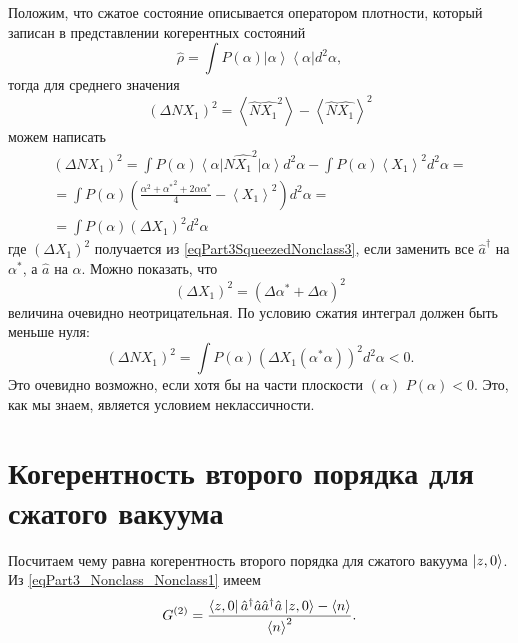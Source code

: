 Положим, что сжатое состояние описывается оператором плотности,
который записан в представлении когерентных состояний
\[
\hat{\rho} = \int P\left(\alpha\right)
\left|\alpha\right>
\left<\alpha\right| d^2 \alpha,
\]
тогда для среднего значения 
\begin{equation}
\left(\Delta N X_1\right)^2 = 
\left<\hat{N} \hat{X_1}^2\right> - \left<\hat{N} \hat{X_1}\right>^2 
\label{eqPart3SqueezedNonclass3}
\end{equation}
можем написать
\begin{eqnarray}
  \left(\Delta N X_1\right)^2 =
  \int P\left(\alpha\right)
  \left<\alpha\right|
  \hat{N} \hat{X_1}^2
  \left|\alpha\right> d^2 \alpha -
  \int P\left(\alpha\right)
  \left< X_1 \right>^2
  d^2 \alpha
  =
  \nonumber \\
  =
  \int  
  P\left(\alpha\right)
  \left(
  \frac{
    \alpha^2 + {\alpha^\ast}^2 +
    2 \alpha \alpha^\ast}{4}
  - \left< X_1 \right>^2
  \right)
   d^2 \alpha
  =
  \nonumber \\
  =
 \int 
P\left(\alpha\right)
\left(\Delta X_1\right)^2
d^2 \alpha
\end{eqnarray}
где $\left(\Delta X_1\right)^2$ получается из
\eqref{eqPart3SqueezedNonclass3}, если заменить все $\hat{a}^{\dag}$ на
$\alpha^{*}$, а $\hat{a}$ на $\alpha$. Можно показать, что
\[
\left(\Delta X_1\right)^2 = \left(\Delta \alpha^{*} + \Delta \alpha\right)^2
\]
величина очевидно неотрицательная. По условию сжатия интеграл должен
быть меньше нуля:
\begin{equation}
\left(\Delta N X_1\right)^2 = 
 \int 
P\left(\alpha\right)
\left(\Delta X_1\left(\alpha^{*}\alpha\right)\right)^2
d^2 \alpha < 0.
\nonumber
\end{equation}
Это очевидно возможно, если хотя бы на части плоскости
$\left(\alpha\right)$ $P\left(\alpha\right) < 0$. Это, как мы знаем,
является условием неклассичности. 

\section{Когерентность второго порядка для сжатого вакуума}

Посчитаем чему равна когерентность второго порядка для сжатого вакуума
$\ket{z, 0}$. Из \eqref{eqPart3_Nonclass_Nonclass1} имеем
\[
G^{(2)} = \frac{\bra{z,0}\hat{a}^{\dag}\hat{a}\hat{a}^{\dag}\hat{a}\ket{z,0}
- \left<n\right>}{\left<n\right>^2}.
\]

